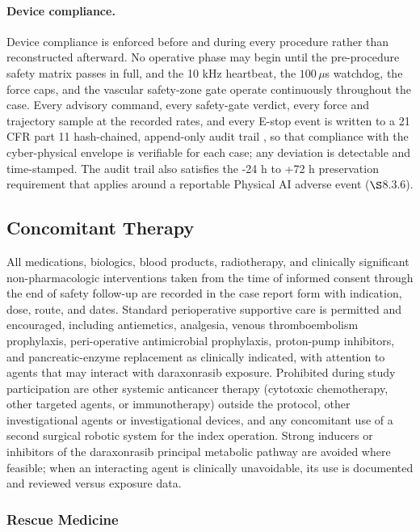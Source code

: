 \paragraph{Device compliance.}
Device compliance is enforced before and during every procedure rather than
reconstructed afterward. No operative phase may begin until the pre-procedure
safety matrix passes in full, and the 10 kHz heartbeat, the $100\,\mu$s watchdog,
the force caps, and the vascular safety-zone gate operate continuously throughout
the case. Every advisory command, every safety-gate verdict, every force and
trajectory sample at the recorded rates, and every E-stop event is written to a
21 CFR part 11 hash-chained, append-only audit trail \cite{ecfr2026part11}, so that
compliance with the cyber-physical envelope is verifiable for each case; any
deviation is detectable and time-stamped. The audit trail also satisfies the -24 h to +72 h preservation requirement that applies around a reportable
Physical AI adverse event ($\S$8.3.6).

\subsection{Concomitant Therapy}

All medications, biologics, blood products, radiotherapy, and clinically significant
non-pharmacologic interventions taken from the time of informed consent through the
end of safety follow-up are recorded in the case report form with indication, dose,
route, and dates. Standard perioperative supportive care is permitted and
encouraged, including antiemetics, analgesia, venous thromboembolism prophylaxis,
peri-operative antimicrobial prophylaxis, proton-pump inhibitors, and
pancreatic-enzyme replacement as clinically indicated, with attention to agents that
may interact with daraxonrasib exposure. Prohibited during study participation are
other systemic anticancer therapy (cytotoxic chemotherapy, other targeted agents,
or immunotherapy) outside the protocol, other investigational agents or
investigational devices, and any concomitant use of a second surgical robotic
system for the index operation. Strong inducers or inhibitors of the daraxonrasib principal
metabolic pathway are avoided where feasible; when an interacting
agent is clinically unavoidable, its use is documented and reviewed versus exposure data.

\subsubsection{Rescue Medicine}

